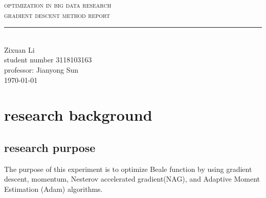 \documentclass[aps,letterpaper,10pt]{article}
\newcommand{\labtitle}{gradient descent method report}
\newcommand{\authorname}{Zixuan Li}
\newcommand{\professor}{Jianyong Sun}
\newcommand{\classno}{3118103163}
\begin{document}


\begin{titlepage}
\begin{center}
{\LARGE \textsc{optimization in big data research} \\ \vspace{4pt}}
{\Large \textsc{\labtitle} \\ \vspace{4pt}}
\rule[13pt]{\textwidth}{1pt} \\ \vspace{150pt}
{\large  \authorname \\ \vspace{10pt}
student number \classno\\ \vspace{10pt}
professor: \professor \\ \vspace{10pt}
\today}
\end{center}
\end{titlepage}

\newpage
\tableofcontents

\newpage
\section{research background}
\subsection{research purpose}

The purpose of this experiment is to optimize Beale function by using gradient descent, momentum, Nesterov accelerated gradient(NAG), and Adaptive Moment Estimation (Adam) algorithms.\vspace{3mm}
\end{document}
